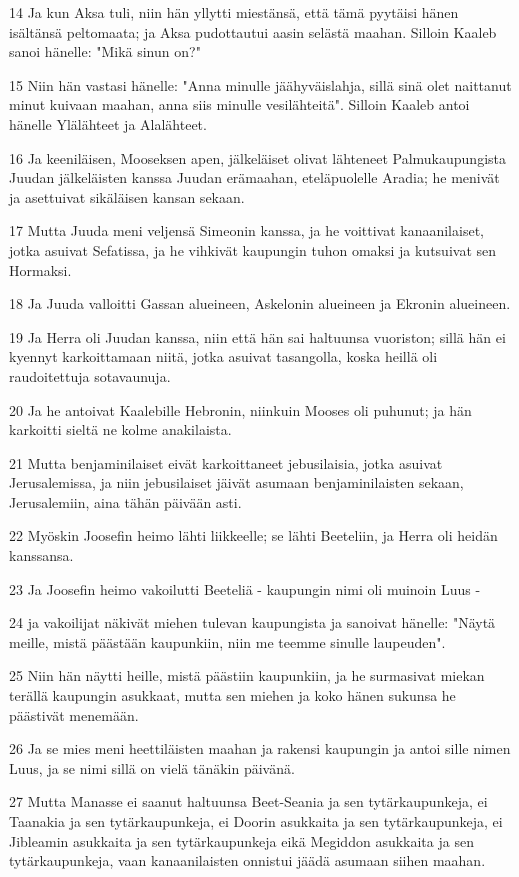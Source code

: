 \par 14 Ja kun Aksa tuli, niin hän yllytti miestänsä, että tämä pyytäisi hänen isältänsä peltomaata; ja Aksa pudottautui aasin selästä maahan. Silloin Kaaleb sanoi hänelle: "Mikä sinun on?"
\par 15 Niin hän vastasi hänelle: "Anna minulle jäähyväislahja, sillä sinä olet naittanut minut kuivaan maahan, anna siis minulle vesilähteitä". Silloin Kaaleb antoi hänelle Ylälähteet ja Alalähteet.
\par 16 Ja keeniläisen, Mooseksen apen, jälkeläiset olivat lähteneet Palmukaupungista Juudan jälkeläisten kanssa Juudan erämaahan, eteläpuolelle Aradia; he menivät ja asettuivat sikäläisen kansan sekaan.
\par 17 Mutta Juuda meni veljensä Simeonin kanssa, ja he voittivat kanaanilaiset, jotka asuivat Sefatissa, ja he vihkivät kaupungin tuhon omaksi ja kutsuivat sen Hormaksi.
\par 18 Ja Juuda valloitti Gassan alueineen, Askelonin alueineen ja Ekronin alueineen.
\par 19 Ja Herra oli Juudan kanssa, niin että hän sai haltuunsa vuoriston; sillä hän ei kyennyt karkoittamaan niitä, jotka asuivat tasangolla, koska heillä oli raudoitettuja sotavaunuja.
\par 20 Ja he antoivat Kaalebille Hebronin, niinkuin Mooses oli puhunut; ja hän karkoitti sieltä ne kolme anakilaista.
\par 21 Mutta benjaminilaiset eivät karkoittaneet jebusilaisia, jotka asuivat Jerusalemissa, ja niin jebusilaiset jäivät asumaan benjaminilaisten sekaan, Jerusalemiin, aina tähän päivään asti.
\par 22 Myöskin Joosefin heimo lähti liikkeelle; se lähti Beeteliin, ja Herra oli heidän kanssansa.
\par 23 Ja Joosefin heimo vakoilutti Beeteliä - kaupungin nimi oli muinoin Luus -
\par 24 ja vakoilijat näkivät miehen tulevan kaupungista ja sanoivat hänelle: "Näytä meille, mistä päästään kaupunkiin, niin me teemme sinulle laupeuden".
\par 25 Niin hän näytti heille, mistä päästiin kaupunkiin, ja he surmasivat miekan terällä kaupungin asukkaat, mutta sen miehen ja koko hänen sukunsa he päästivät menemään.
\par 26 Ja se mies meni heettiläisten maahan ja rakensi kaupungin ja antoi sille nimen Luus, ja se nimi sillä on vielä tänäkin päivänä.
\par 27 Mutta Manasse ei saanut haltuunsa Beet-Seania ja sen tytärkaupunkeja, ei Taanakia ja sen tytärkaupunkeja, ei Doorin asukkaita ja sen tytärkaupunkeja, ei Jibleamin asukkaita ja sen tytärkaupunkeja eikä Megiddon asukkaita ja sen tytärkaupunkeja, vaan kanaanilaisten onnistui jäädä asumaan siihen maahan.
